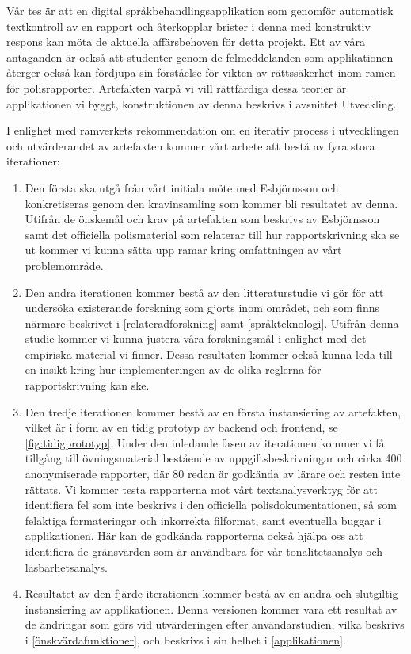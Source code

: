 \documentclass[swedish]{maucsthesis}
\begin{document}
Vår tes är att en digital språkbehandlingsapplikation som genomför automatisk
textkontroll av en rapport och återkopplar brister i denna med konstruktiv
respons kan möta de aktuella affärsbehoven för detta projekt. Ett av våra
antaganden är också att studenter genom de felmeddelanden som applikationen
återger också kan fördjupa sin förståelse för vikten av rättssäkerhet inom ramen
för polisrapporter. Artefakten varpå vi vill rättfärdiga dessa teorier är
applikationen vi byggt, konstruktionen av denna beskrivs i avsnittet Utveckling.

I enlighet med ramverkets rekommendation om en iterativ process i utvecklingen och utvärderandet av artefakten kommer vårt arbete att bestå av fyra stora iterationer:

\begin{enumerate}
\item Den första ska utgå från vårt initiala möte med Esbjörnsson och konkretiseras genom den kravinsamling som kommer bli resultatet av denna.
  Utifrån de önskemål och krav på artefakten som beskrivs av Esbjörnsson samt det
  officiella polismaterial som relaterar till hur rapportskrivning ska se ut
  kommer vi kunna sätta upp ramar kring omfattningen av vårt problemområde.
\item Den andra iterationen kommer bestå av den litteraturstudie vi gör för att undersöka existerande forskning som gjorts inom området, och som finns
  närmare beskrivet i \cref{relateradforskning} samt \cref{språkteknologi}.
  Utifrån denna studie kommer vi kunna justera våra forskningsmål i enlighet med det
  empiriska material vi finner. Dessa resultaten kommer också kunna leda till en insikt kring
  hur implementeringen av de olika reglerna för rapportskrivning kan ske.
\item Den tredje iterationen kommer bestå av en första instansiering av artefakten, vilket är i form av en tidig prototyp av backend och frontend, se
  \cref{fig:tidigprototyp}. Under den inledande fasen av iterationen kommer vi få tillgång till övningsmaterial bestående av uppgiftsbeskrivningar och cirka
  400 anonymiserade rapporter, där 80 redan är godkända av lärare och resten inte rättats. Vi kommer testa rapporterna mot vårt textanalysverktyg för
  att identifiera fel som inte beskrivs i den officiella polisdokumentationen,
  så som felaktiga formateringar och inkorrekta filformat, samt eventuella
  buggar i applikationen. Här kan de godkända rapporterna också hjälpa oss att
  identifiera de gränsvärden som är användbara för vår tonalitetsanalys och
  läsbarhetsanalys.
\item Resultatet av den fjärde iterationen kommer bestå av en andra och slutgiltig
  instansiering av applikationen. Denna versionen kommer vara ett resultat av de
  ändringar som görs vid utvärderingen efter användarstudien, vilka beskrivs i
  \cref{önskvärdafunktioner}, och beskrivs i sin helhet i
  \cref{applikationen}.
\end{enumerate}
\end{document}
